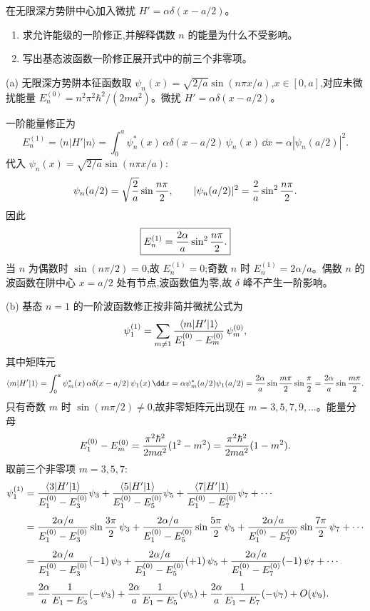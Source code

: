 \begin{question}
在无限深方势阱中心加入微扰 $H'=\alpha\delta(x-a/2)$。
\begin{enumerate}
\item 求允许能级的一阶修正,并解释偶数 $n$ 的能量为什么不受影响。
\item 写出基态波函数一阶修正展开式中的前三个非零项。
\end{enumerate}
\end{question}
\begin{solution}
(a) 无限深方势阱本征函数取 $\psi_n(x)=\sqrt{2/a}\sin(n\pi x/a)$,$x\in[0,a]$,对应未微扰能量 $E_n^{(0)}=n^2\pi^2\hbar^2/(2ma^2)$。微扰 $H'=\alpha\delta(x-a/2)$。

一阶能量修正为
\[
E_n^{(1)}=\langle n|H'|n\rangle=\int_0^a \psi_n^*(x)\,\alpha\delta(x-a/2)\,\psi_n(x)\,\dd x
=\alpha|\psi_n(a/2)|^2.
\]
代入 $\psi_n(x)=\sqrt{2/a}\sin(n\pi x/a)$:
\[
\psi_n(a/2)=\sqrt{2\over a}\sin{n\pi\over2},\qquad
|\psi_n(a/2)|^2={2\over a}\sin^2{n\pi\over2}.
\]
因此
\[
\boxed{E_n^{(1)}={2\alpha\over a}\sin^2{n\pi\over2}.}
\]
当 $n$ 为偶数时 $\sin(n\pi/2)=0$,故 $E_n^{(1)}=0$;奇数 $n$ 时 $E_n^{(1)}=2\alpha/a$。偶数 $n$ 的波函数在阱中心 $x=a/2$ 处有节点,波函数值为零,故 $\delta$ 峰不产生一阶影响。

(b) 基态 $n=1$ 的一阶波函数修正按非简并微扰公式为
\[
\psi_1^{(1)}=\sum_{m\ne1}{\langle m|H'|1\rangle\over E_1^{(0)}-E_m^{(0)}}\,\psi_m^{(0)},
\]
其中矩阵元
\[
\langle m|H'|1\rangle=\int_0^a\psi_m^*(x)\,\alpha\delta(x-a/2)\,\psi_1(x)\,\dd x
=\alpha\psi_m^*(a/2)\psi_1(a/2)
={2\alpha\over a}\sin{m\pi\over2}\sin{\pi\over2}
={2\alpha\over a}\sin{m\pi\over2}.
\]
只有奇数 $m$ 时 $\sin(m\pi/2)\ne0$,故非零矩阵元出现在 $m=3,5,7,9,\dots$。能量分母
\[
E_1^{(0)}-E_m^{(0)}={\pi^2\hbar^2\over2ma^2}(1^2-m^2)
={\pi^2\hbar^2\over2ma^2}(1-m^2).
\]
取前三个非零项 $m=3,5,7$:
\[
\begin{aligned}
\psi_1^{(1)}&=
{\langle3|H'|1\rangle\over E_1^{(0)}-E_3^{(0)}}\psi_3
+{\langle5|H'|1\rangle\over E_1^{(0)}-E_5^{(0)}}\psi_5
+{\langle7|H'|1\rangle\over E_1^{(0)}-E_7^{(0)}}\psi_7+\cdots\\[4pt]
&={2\alpha/a\over E_1^{(0)}-E_3^{(0)}}\sin{3\pi\over2}\,\psi_3
+{2\alpha/a\over E_1^{(0)}-E_5^{(0)}}\sin{5\pi\over2}\,\psi_5
+{2\alpha/a\over E_1^{(0)}-E_7^{(0)}}\sin{7\pi\over2}\,\psi_7+\cdots\\[4pt]
&={2\alpha/a\over E_1^{(0)}-E_3^{(0)}}(-1)\,\psi_3
+{2\alpha/a\over E_1^{(0)}-E_5^{(0)}}(+1)\,\psi_5
+{2\alpha/a\over E_1^{(0)}-E_7^{(0)}}(-1)\,\psi_7+\cdots\\[4pt]
&={2\alpha\over a}{1\over E_1-E_3}(-\psi_3)
+{2\alpha\over a}{1\over E_1-E_5}(\psi_5)
+{2\alpha\over a}{1\over E_1-E_7}(-\psi_7)+O(\psi_9).
\end{aligned}
\]
\end{solution}

